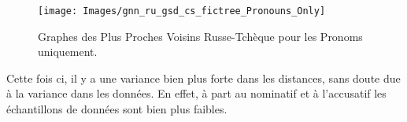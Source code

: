 \documentclass{article}
\begin{document}
\begin{figure}[h]
        \centering
        \texttt{[image: Images/gnn\_ru\_gsd\_cs\_fictree\_Pronouns\_Only]}
        \caption{Graphes des Plus Proches Voisins Russe-Tchèque pour les Pronoms uniquement.}
\end{figure}

Cette fois ci, il y a une variance bien plus forte dans les distances, sans doute due à la variance dans les données. En effet, à part au nominatif et à l'accusatif les échantillons de données sont bien plus faibles.

\begin{table}[h]
        \centering
\end{table}
\end{document}
